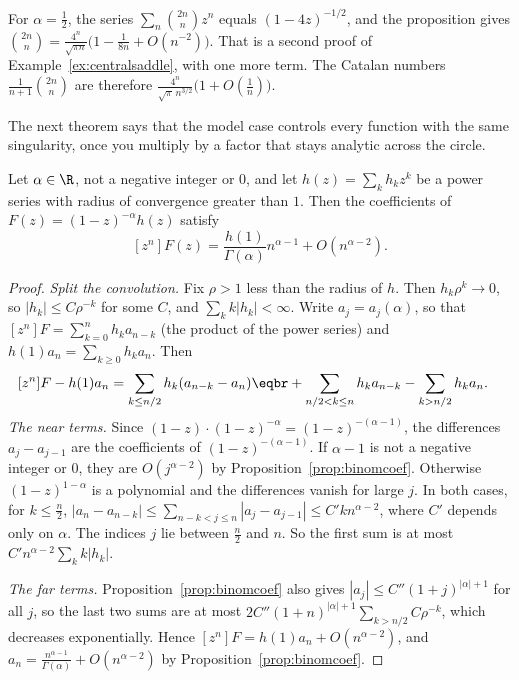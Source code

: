 For $\alpha=\frac12$, the series $\sum_n\binom{2n}nz^n$ equals $(1-4z)^{-1/2}$, and the proposition gives $\binom{2n}n=\frac{4^n}{\sqrt{\pi n}}\bigl(1-\frac1{8n}+O(n^{-2})\bigr)$. That is a second proof of Example~\ref{ex:centralsaddle}, with one more term. The Catalan numbers $\frac1{n+1}\binom{2n}n$ are therefore $\frac{4^n}{\sqrt\pi\,n^{3/2}}\bigl(1+O(\frac1n)\bigr)$.

The next theorem says that the model case controls every function with the same singularity, once you multiply by a factor that stays analytic across the circle.

\begin{theorem}[transfer]\label{thm:transfer}
Let $\alpha\in\R$, not a negative integer or $0$, and let $h(z)=\sum_kh_kz^k$ be a power series with radius of convergence greater than $1$. Then the
coefficients of $F(z)=(1-z)^{-\alpha}h(z)$ satisfy
\[
[z^n]F(z)=\frac{h(1)}{\Gamma(\alpha)}n^{\alpha-1}+O(n^{\alpha-2}).
\]
\end{theorem}

\begin{proof}
\emph{Split the convolution.} Fix $\rho>1$ less than the radius of $h$. Then $h_k\rho^k\to0$, so $|h_k|\le C\rho^{-k}$ for some $C$, and $\sum_kk|h_k|<\infty$. Write $a_j=a_j(\alpha)$, so that $[z^n]F=\sum_{k=0}^nh_ka_{n-k}$ (the product of the power series) and $h(1)a_n=\sum_{k\ge0}h_ka_n$. Then
\[
\begin{aligned}{}[z^n]F-h(1)a_n&=\sum_{k\le n/2}h_k(a_{n-k}-a_n)\eqbr+\sum_{n/2<k\le n}h_ka_{n-k}-\sum_{k>n/2}h_ka_n.\end{aligned}
\]
\emph{The near terms.} Since $(1-z)\cdot(1-z)^{-\alpha}=(1-z)^{-(\alpha-1)}$, the differences $a_j-a_{j-1}$ are the coefficients of $(1-z)^{-(\alpha-1)}$. If $\alpha-1$ is not a negative integer or $0$, they are $O(j^{\alpha-2})$ by Proposition~\ref{prop:binomcoef}. Otherwise $(1-z)^{1-\alpha}$ is a polynomial and the differences vanish for large $j$. In both cases, for $k\le\frac n2$, $|a_n-a_{n-k}|\le\sum_{n-k<j\le n}|a_j-a_{j-1}|\le C'kn^{\alpha-2}$, where $C'$ depends only on $\alpha$. The indices $j$ lie between $\frac n2$ and $n$. So the first sum is at most $C'n^{\alpha-2}\sum_kk|h_k|$.

\emph{The far terms.} Proposition~\ref{prop:binomcoef} also gives $|a_j|\le C''(1+j)^{|\alpha|+1}$ for all $j$, so the last two sums are at most $2C''(1+n)^{|\alpha|+1}\sum_{k>n/2}C\rho^{-k}$, which decreases exponentially. Hence $[z^n]F=h(1)a_n+O(n^{\alpha-2})$, and $a_n=\frac{n^{\alpha-1}}{\Gamma(\alpha)}+O(n^{\alpha-2})$ by Proposition~\ref{prop:binomcoef}.
\end{proof}


